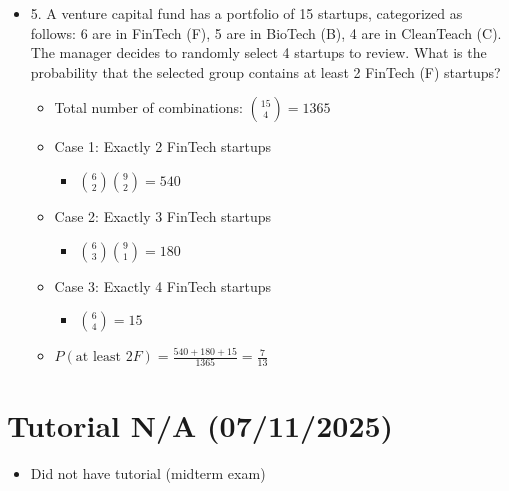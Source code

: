 \documentclass{article}
\begin{document}
\begin{itemize}
\begin{itemize}
\begin{itemize}
        \end{itemize}
    \end{itemize}
    \item 5. A venture capital fund has a portfolio of 15 startups, categorized as follows: 6 are in FinTech (F), 5 are in BioTech (B), 4 are in CleanTeach (C). The manager decides to randomly select 4 startups to review. What is the probability that the selected group contains at least 2 FinTech (F) startups?
    \begin{itemize}
        \item Total number of combinations: $\binom{15}{4} = 1365$
        \item Case 1: Exactly 2 FinTech startups
        \begin{itemize}
            \item $\binom{6}{2} \binom{9}{2} = 540$
        \end{itemize}
        \item Case 2: Exactly 3 FinTech startups
        \begin{itemize}
            \item $\binom{6}{3}\binom{9}{1} = 180$
        \end{itemize}
        \item Case 3: Exactly 4 FinTech startups
        \begin{itemize}
            \item $\binom{6}{4} = 15$
        \end{itemize}
        \item $P(\text{at least }2F) = \frac{540+180+15}{1365} = \frac{7}{13}$
    \end{itemize}
\end{itemize}

\section{Tutorial N/A (07/11/2025)}
\begin{itemize}
    \item Did not have tutorial (midterm exam)
\end{itemize}
\end{document}
